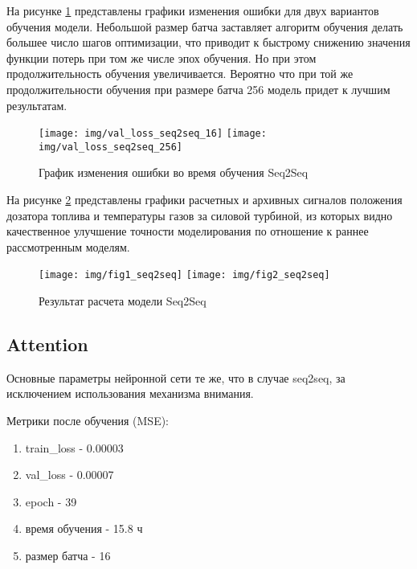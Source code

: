 \documentclass[12pt,a4paper]{article}
\begin{document}
На рисунке \ref{fig:val_loss_seq2seq} представлены графики изменения ошибки для двух вариантов обучения модели. Небольшой размер батча заставляет алгоритм обучения делать большее число шагов оптимизации, что приводит к быстрому снижению значения функции потерь при том же числе эпох обучения. Но при этом продолжительность обучения увеличивается. Вероятно что при той же продолжительности обучения при размере батча 256 модель придет к лучшим результатам. 

\begin{figure}[htb]
	\centering\texttt{[image: img/val\_loss\_seq2seq\_16]}
	\centering\texttt{[image: img/val\_loss\_seq2seq\_256]}
	\caption{График изменения ошибки во время обучения Seq2Seq}
	\label{fig:val_loss_seq2seq}
\end{figure}

На рисунке \ref{fig:res_seq2seq} представлены графики расчетных и архивных сигналов положения дозатора топлива и температуры газов за силовой турбиной, из которых видно качественное улучшение точности моделирования по отношение к раннее рассмотренным моделям.

\begin{figure}[htb]
	\centering\texttt{[image: img/fig1\_seq2seq]}
	\centering\texttt{[image: img/fig2\_seq2seq]}
	\caption{Результат расчета модели Seq2Seq}
	\label{fig:res_seq2seq}
\end{figure}


\subsection{Attention}

Основные параметры нейронной сети те же, что в случае seq2seq, за исключением использования механизма внимания.

\begin{description}
	\item Метрики после обучения (MSE):
	\renewcommand\labelenumi{}
	\begin{enumerate}
		\item train\_loss - 0.00003
		\item val\_loss - 0.00007
		\item epoch - 39
		\item время обучения - 15.8 ч
		\item размер батча - 16
	\end{enumerate}
\end{description}
\end{document}
